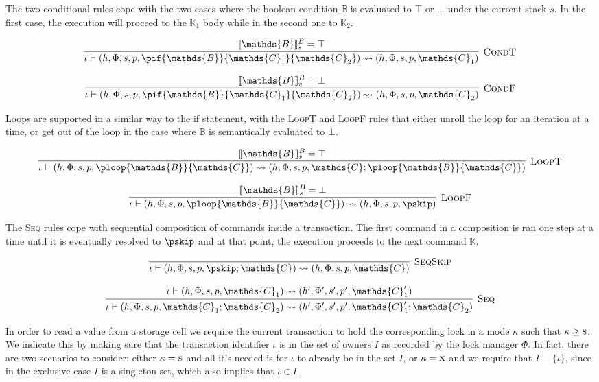 The two conditional rules cope with the two cases where the boolean condition $\mathds{B}$ is evaluated to $\top$ or $\bot$ under the current stack $s$. In the first case, the execution will proceed to the $\mathds{K}_1$ body while in the second one to $\mathds{K}_2$.

\[
\infer[\textsc{CondT}]
{
	\iota \vdash (h, \Phi, s, p, \pif{\mathds{B}}{\mathds{C}_1}{\mathds{C}_2})
	\rightsquigarrow
	(h, \Phi, s, p, \mathds{C}_1)
}
{
	\llbracket \mathds{B} \rrbracket_s^B = \top
}
\]

\[
\infer[\textsc{CondF}]
{
	\iota \vdash (h, \Phi, s, p, \pif{\mathds{B}}{\mathds{C}_1}{\mathds{C}_2})
	\rightsquigarrow
	(h, \Phi, s, p, \mathds{C}_2)
}
{
	\llbracket \mathds{B} \rrbracket_s^B = \bot
}
\]

Loops are supported in a similar way to the if statement, with the \textsc{LoopT} and \textsc{LoopF} rules that either unroll the loop for an iteration at a time, or get out of the loop in the case where $\mathds{B}$ is semantically evaluated to $\bot$.

\[
\infer[\textsc{LoopT}]
{
	\iota \vdash (h, \Phi, s, p, \ploop{\mathds{B}}{\mathds{C}})
	\rightsquigarrow
	(h, \Phi, s, p, \mathds{C}; \ploop{\mathds{B}}{\mathds{C}})
}
{
	\llbracket \mathds{B} \rrbracket_s^B = \top
}
\]

\[
\infer[\textsc{LoopF}]
{
	\iota \vdash (h, \Phi, s, p, \ploop{\mathds{B}}{\mathds{C}})
	\rightsquigarrow
	(h, \Phi, s, p, \pskip)
}
{
	\llbracket \mathds{B} \rrbracket_s^B = \bot
}
\]

The \textsc{Seq} rules cope with sequential composition of commands inside a transaction. The first command in a composition is ran one step at a time until it is eventually resolved to $\pskip$ and at that point, the execution proceeds to the next command $\mathds{K}$.

\[
\infer[\textsc{SeqSkip}]
{
	\iota \vdash (h, \Phi, s, p, \pskip ; \mathds{C})
	\rightsquigarrow
	(h, \Phi, s, p, \mathds{C})
}
{}
\]

\[
\infer[\textsc{Seq}]
{
	\iota \vdash (h, \Phi, s, p, \mathds{C}_1 ; \mathds{C}_2)
	\rightsquigarrow
	(h', \Phi', s', p', \mathds{C}_1' ; \mathds{C}_2)
}
{
	\iota \vdash (h, \Phi, s, p, \mathds{C}_1)
	\rightsquigarrow
	(h', \Phi', s', p', \mathds{C}_1')
}
\]

In order to read a value from a storage cell we require the current transaction to hold the corresponding lock in a mode $\kappa$ such that $\kappa \geq \textsc{s}$. We indicate this by making sure that the transaction identifier $\iota$ is in the set of owners $I$ as recorded by the lock manager $\Phi$. In fact, there are two scenarios to consider: either $\kappa = \textsc{s}$ and all it's needed is for $\iota$ to already be in the set $I$, or $\kappa = \textsc{x}$ and we require that $I \equiv \{ \iota \}$, since in the exclusive case $I$ is a singleton set, which also implies that $\iota \in I$.


